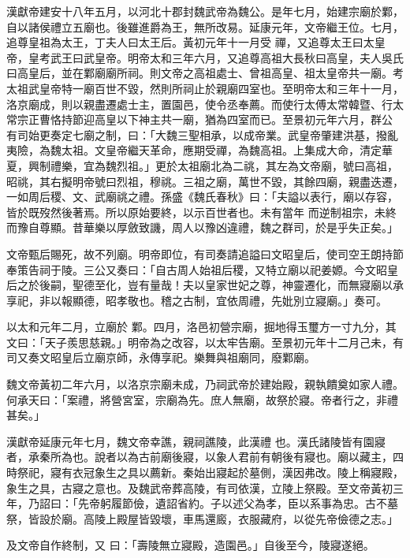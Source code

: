 \begin{pinyinscope}
 漢獻帝建安十八年五月，以河北十郡封魏武帝為魏公。是年七月，始建宗廟於鄴，自以諸侯禮立五廟也。後雖進爵為王，無所改易。延康元年，文帝繼王位。七月，追尊皇祖為太王，丁夫人曰太王后。黃初元年十一月受
 禪，又追尊太王曰太皇帝，皇考武王曰武皇帝。明帝太和三年六月，又追尊高祖大長秋曰高皇，夫人吳氏曰高皇后，並在鄴廟廟所祠。則文帝之高祖處士、曾祖高皇、祖太皇帝共一廟。考太祖武皇帝特一廟百世不毀，然則所祠止於親廟四室也。至明帝太和三年十一月，洛京廟成，則以親盡遷處士主，置園邑，使令丞奉薦。而使行太傅太常韓暨、行太常宗正曹恪持節迎高皇以下神主共一廟，猶為四室而已。至景初元年六月，群公
 有司始更奏定七廟之制，曰：「大魏三聖相承，以成帝業。武皇帝肇建洪基，撥亂夷險，為魏太祖。文皇帝繼天革命，應期受禪，為魏高祖。上集成大命，清定華夏，興制禮樂，宜為魏烈祖。」更於太祖廟北為二祧，其左為文帝廟，號曰高祖，昭祧，其右擬明帝號曰烈祖，穆祧。三祖之廟，萬世不毀，其餘四廟，親盡迭遷，一如周后稷、文、武廟祧之禮。孫盛《魏氏春秋》曰：「夫謚以表行，廟以存容，皆於既歿然後著焉。所以原始要終，以示百世者也。未有當年
 而逆制祖宗，未終而豫自尊顯。昔華樂以厚斂致譏，周人以豫凶違禮，魏之群司，於是乎失正矣。」



 文帝甄后賜死，故不列廟。明帝即位，有司奏請追謚曰文昭皇后，使司空王朗持節奉策告祠于陵。三公又奏曰：「自古周人始祖后稷，又特立廟以祀姜嫄。今文昭皇后之於後嗣，聖德至化，豈有量哉！夫以皇家世妃之尊，神靈遷化，而無寢廟以承享祀，非以報顯德，昭孝敬也。稽之古制，宜依周禮，先妣別立寢廟。」奏可。



 以太和元年二月，立廟於
 鄴。四月，洛邑初營宗廟，掘地得玉璽方一寸九分，其文曰：「天子羨思慈親。」明帝為之改容，以太牢告廟。至景初元年十二月己未，有司又奏文昭皇后立廟京師，永傳享祀。樂舞與祖廟同，廢鄴廟。



 魏文帝黃初二年六月，以洛京宗廟未成，乃祠武帝於建始殿，親執饋奠如家人禮。何承天曰：「案禮，將營宮室，宗廟為先。庶人無廟，故祭於寢。帝者行之，非禮甚矣。」



 漢獻帝延康元年七月，魏文帝幸譙，親祠譙陵，此漢禮
 也。漢氏諸陵皆有園寢者，承秦所為也。說者以為古前廟後寢，以象人君前有朝後有寢也。廟以藏主，四時祭祀，寢有衣冠象生之具以薦新。秦始出寢起於墓側，漢因弗改。陵上稱寢殿，象生之具，古寢之意也。及魏武帝葬高陵，有司依漢，立陵上祭殿。至文帝黃初三年，乃詔曰：「先帝躬履節儉，遺詔省約。子以述父為孝，臣以系事為忠。古不墓祭，皆設於廟。高陵上殿屋皆毀壞，車馬還廄，衣服藏府，以從先帝儉德之志。」



 及文帝自作終制，又
 曰：「壽陵無立寢殿，造園邑。」自後至今，陵寢遂絕。




\end{pinyinscope}
